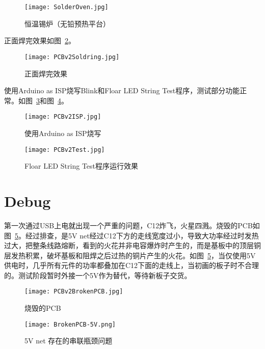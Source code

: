 \begin{figure}[htbp]
    \centering
    \texttt{[image: SolderOven.jpg]}
    \caption{恒温锡炉（无铅预热平台）}
    \label{fig:SolderOven}
\end{figure}


正面焊完效果如图~\ref{fig:PCBv2Soldring}。

\begin{figure}[htbp]
    \centering
    \texttt{[image: PCBv2Soldring.jpg]}
    \caption{正面焊完效果}
    \label{fig:PCBv2Soldring}
\end{figure}

使用Arduino as ISP烧写Blink和Floar LED String Test程序，测试部分功能正常。如图~\ref{fig:PCBv2ISP}和图~\ref{fig:PCBv2Test}。

\begin{figure}[htbp]
    \centering
    \texttt{[image: PCBv2ISP.jpg]}
    \caption{使用Arduino as ISP烧写}
    \label{fig:PCBv2ISP}
\end{figure}

\begin{figure}[htbp]
    \centering
    \texttt{[image: PCBv2Test.jpg]}
    \caption{Floar LED String Test程序运行效果}
    \label{fig:PCBv2Test}
\end{figure}

\section{Debug}

第一次通过USB上电就出现一个严重的问题，C12炸飞，火星四溅。烧毁的PCB如图~\ref{fig:BrokenPCB}。经过排查，是5V net经过C12下方的走线宽度过小，导致大功率经过时发热过大，把整条线路熔断，看到的火花并非电容爆炸时产生的，而是基板中的顶层铜层发热积累，破坏基板和阻焊之后过热的铜片产生的火花。如图~\ref{fig:BrokenPCB}，当仅使用5V供电时，几乎所有元件的功率都叠加在C12下面的走线上，当初画的板子时不合理的。测试阶段暂时外接一个5V作为替代，等待新板子交货。

\begin{figure}[htbp]
    \centering
    \texttt{[image: PCBv2BrokenPCB.jpg]}
    \caption{烧毁的PCB}
    \label{fig:BrokenPCB}
\end{figure}

\begin{figure}[htbp]
    \centering
    \texttt{[image: BrokenPCB-5V.png]}
    \caption{5V net 存在的串联瓶颈问题}
    \label{fig:BrokenPCB-Illumination}
\end{figure}

